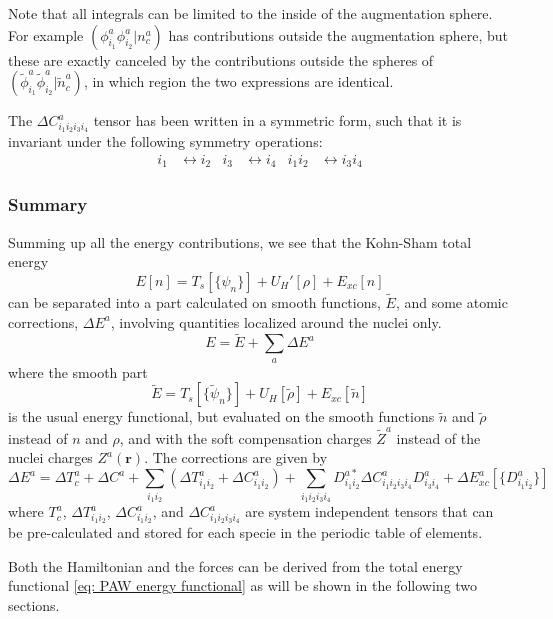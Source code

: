 \documentclass[a4paper]{article}
\newcommand{\s}[1]{\tilde{#1}}
\newcommand{\br}{\mathbf{r}}
\begin{document}
%
Note that all integrals can be limited to the inside of the
augmentation sphere. For example $(\phi_{i_1}^a\phi_{i_2}^{a}|n_c^a)$
has contributions outside the augmentation sphere, but these are
exactly canceled by the contributions outside the spheres of
$(\s{\phi}_{i_1}^a\s{\phi}_{i_2}^{a}|\s{n}_c^a)$, in which region the
two expressions are identical.
\par The $\Delta C^a_{i_1i_2i_3i_4}$ tensor has been written in a symmetric
form, such that it is invariant under the following symmetry
operations:
%
\begin{align}\label{eq: C symmetry}
  i_1 &\leftrightarrow i_2 &   i_3 &\leftrightarrow i_4 &   i_1i_2 &\leftrightarrow i_3i_4
\end{align}
%
%
%

\subsubsection{Summary}
Summing up all the energy contributions, we see that the Kohn-Sham total energy
%
\begin{equation*}
  E[n] = T_s[\{\psi_n\}] + U_H'[\rho] + E_{xc}[n]
\end{equation*}
% 
can be separated into a part calculated on smooth functions, $\s{E}$,
and some atomic corrections, $\Delta E^a$, involving quantities
localized around the nuclei only.
%
\begin{equation}\label{eq: PAW energy functional}
E = \s{E} + \sum_a \Delta E^a
\end{equation}
% 
where the smooth part
%
\begin{equation}
  \s{E} = T_s[\{\s{\psi}_n\}] + U_H[\s{\rho}] + E_{xc}[\s{n}]
\end{equation}
%
is the usual energy functional, but evaluated on the smooth functions
$\s{n}$ and $\s{\rho}$ instead of $n$ and $\rho$, and with the soft
compensation charges $\s{Z}^a$ instead of the nuclei charges
$Z^a(\br)$. The corrections are given by
%
\begin{equation}
  \Delta E^a = \Delta T_c^a + \Delta C^a + \sum_{i_1i_2} \left(\Delta T^a_{i_1i_2} + \Delta C^a_{i_1i_2}\right) + \sum_{i_1i_2i_3i_4} D^{a*}_{i_1i_2} \Delta C^a_{i_1i_2i_3i_4} D^a_{i_3i_4} + \Delta E_{xc}^a[\{D^a_{i_1i_2}\}]
\end{equation}
%
where $T^a_c$, $\Delta T_{i_1i_2}^a$, $\Delta C_{i_1i_2}^a$, and
$\Delta C_{i_1i_2i_3i_4}^a$ are system independent tensors that can be
pre-calculated and stored for each specie in the periodic table of
elements.
\par Both the Hamiltonian and the forces can be derived from the total
energy functional \ref{eq: PAW energy functional} as will be shown
in the following two sections.
\end{document}
